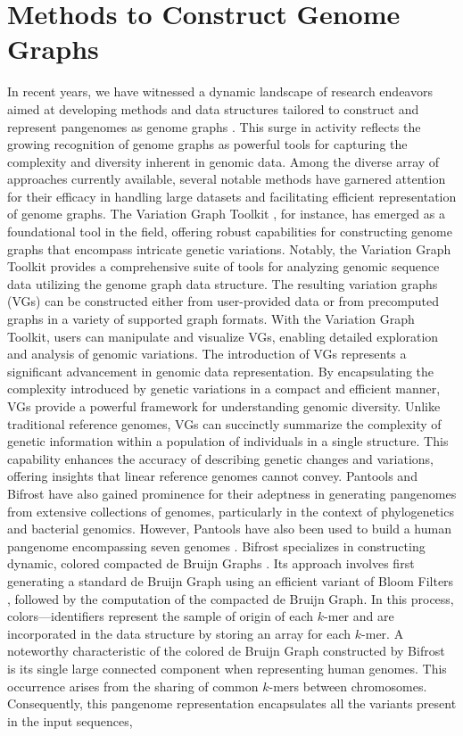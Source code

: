 \documentclass[a4paper, titlepage, openright]{book}
\begin{document}
\section{Methods to Construct Genome Graphs}
In recent years, we have witnessed a dynamic landscape of research endeavors aimed at developing methods and data structures tailored to construct and represent pangenomes as genome graphs \citep{computational2018computational,andreace2023comparing}. This surge in activity reflects the growing recognition of genome graphs as powerful tools for capturing the complexity and diversity inherent in genomic data. Among the diverse array of approaches currently available, several notable methods have garnered attention for their efficacy in handling large datasets and facilitating efficient representation of genome graphs. The Variation Graph Toolkit \citep{garrison2018variation}, for instance, has emerged as a foundational tool in the field, offering robust capabilities for constructing genome graphs that encompass intricate genetic variations. Notably, the Variation Graph Toolkit provides a comprehensive suite of tools for analyzing genomic sequence data utilizing the genome graph data structure. The resulting variation graphs (VGs) can be constructed either from user-provided data or from precomputed graphs in a variety of supported graph formats. With the Variation Graph Toolkit, users can manipulate and visualize VGs, enabling detailed exploration and analysis of genomic variations. The introduction of VGs represents a significant advancement in genomic data representation. By encapsulating the complexity introduced by genetic variations in a compact and efficient manner, VGs provide a powerful framework for understanding genomic diversity. Unlike traditional reference genomes, VGs can succinctly summarize the complexity of genetic information within a population of individuals in a single structure. This capability enhances the accuracy of describing genetic changes and variations, offering insights that linear reference genomes cannot convey. Pantools \citep{sheikhizadeh2016pantools} and Bifrost \citep{holley2020bifrost} have also gained prominence for their adeptness in generating pangenomes from extensive collections of genomes, particularly in the context of phylogenetics and bacterial genomics. However, Pantools have also been used to build a human pangenome encompassing seven genomes \citep{sheikhizadeh2016pantools}. Bifrost specializes in constructing dynamic, colored compacted de Bruijn Graphs \citep{muggli2017succinct}. Its approach involves first generating a standard de Bruijn Graph using an efficient variant of Bloom Filters \citep{tarkoma2011theory}, followed by the computation of the compacted de Bruijn Graph. In this process, colors—identifiers represent the sample of origin of each $k$-mer and are incorporated in the data structure by storing an array for each $k$-mer. A noteworthy characteristic of the colored de Bruijn Graph constructed by Bifrost is its single large connected component when representing human genomes. This occurrence arises from the sharing of common $k$-mers between chromosomes. Consequently, this pangenome representation encapsulates all the variants present in the input sequences, 
\end{document}
